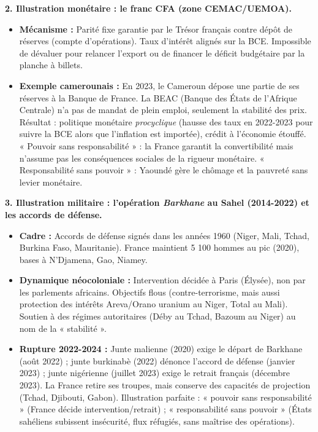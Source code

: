 \documentclass[11pt]{article}
\begin{document}
\begin{exoresolu}
\textbf{2. Illustration monétaire : le franc CFA (zone CEMAC/UEMOA).}
\begin{itemize}
    \item \textbf{Mécanisme :} Parité fixe garantie par le Trésor français contre dépôt de réserves (compte d'opérations). Taux d'intérêt alignés sur la BCE. Impossible de dévaluer pour relancer l'export ou de financer le déficit budgétaire par la planche à billets.
    \item \textbf{Exemple camerounais :} En 2023, le Cameroun dépose une partie de ses réserves à la Banque de France. La BEAC (Banque des États de l'Afrique Centrale) n'a pas de mandat de plein emploi, seulement la stabilité des prix. Résultat : politique monétaire \emph{procyclique} (hausse des taux en 2022-2023 pour suivre la BCE alors que l'inflation est importée), crédit à l'économie étouffé. « Pouvoir sans responsabilité » : la France garantit la convertibilité mais n'assume pas les conséquences sociales de la rigueur monétaire. « Responsabilité sans pouvoir » : Yaoundé gère le chômage et la pauvreté sans levier monétaire.
\end{itemize}

\textbf{3. Illustration militaire : l'opération \emph{Barkhane} au Sahel (2014-2022) et les accords de défense.}
\begin{itemize}
    \item \textbf{Cadre :} Accords de défense signés dans les années 1960 (Niger, Mali, Tchad, Burkina Faso, Mauritanie). France maintient 5 100 hommes au pic (2020), bases à N'Djamena, Gao, Niamey.
    \item \textbf{Dynamique néocoloniale :} Intervention décidée à Paris (Élysée), non par les parlements africains. Objectifs flous (contre-terrorisme, mais aussi protection des intérêts Areva/Orano uranium au Niger, Total au Mali). Soutien à des régimes autoritaires (Déby au Tchad, Bazoum au Niger) au nom de la « stabilité ».
    \item \textbf{Rupture 2022-2024 :} Junte malienne (2020) exige le départ de Barkhane (août 2022) ; junte burkinabè (2022) dénonce l'accord de défense (janvier 2023) ; junte nigérienne (juillet 2023) exige le retrait français (décembre 2023). La France retire ses troupes, mais conserve des capacités de projection (Tchad, Djibouti, Gabon). Illustration parfaite : « pouvoir sans responsabilité » (France décide intervention/retrait) ; « responsabilité sans pouvoir » (États sahéliens subissent insécurité, flux réfugiés, sans maîtrise des opérations).
\end{itemize}


\end{exoresolu}
\end{document}
